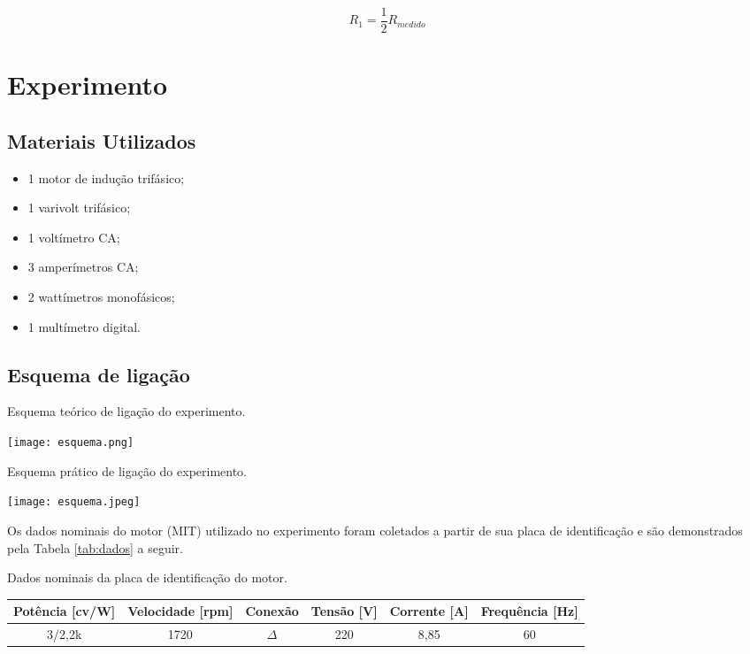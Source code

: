 \documentclass[a4paper,12pt,oneside]{article}
\begin{document}
\begin{equation}
R_1 = \frac{1}{2}R_{medido}
\end{equation}

\newpage
\section{Experimento}\hspace{0pt}

\subsection{Materiais Utilizados}

\begin{itemize}
\item 1 motor de indução trifásico;
\item 1 varivolt trifásico;
\item 1 voltímetro CA;
\item 3 amperímetros CA;
\item 2 wattímetros monofásicos;
\item 1 multímetro digital.
\end{itemize}

\subsection{Esquema de ligação}

\begin{center}
\captionsetup{type=figure}
\caption{Esquema teórico de ligação do experimento.}
\texttt{[image: esquema.png]}\label{fig:esquema}
\end{center}

\newpage
\begin{center}
\captionsetup{type=figure}
\caption{Esquema prático de ligação do experimento.}
\texttt{[image: esquema.jpeg]}\label{fig:montagem}
\end{center}


Os dados nominais do motor (MIT) utilizado no experimento foram coletados a partir de sua placa de identificação e são demonstrados pela Tabela \ref{tab:dados} a seguir.

\begin{scriptsize}
\begin{center}
\renewcommand{\arraystretch}{1.5}
\captionsetup{type=table}
\caption{Dados nominais da placa de identificação do motor.}\vspace{2mm}
\begin{tabular}{c|c|c|c|c|c}\label{tab:dados}
\textbf{Potência [cv/W]} & \textbf{Velocidade [rpm]} & \textbf{Conexão} & \textbf{Tensão [V]} & \textbf{Corrente [A]} & \textbf{Frequência [Hz]}\\ \hline
3/2,2k & 1720 & $\Delta$ & 220 & 8,85 & 60\\ \hline
\end{tabular}
\end{center}
\end{scriptsize}
\end{document}
